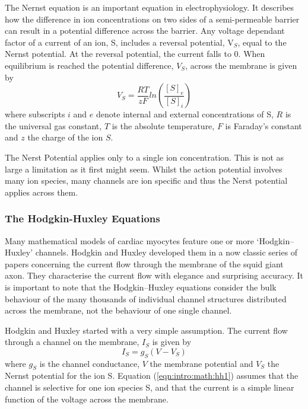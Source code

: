 The Nernst equation is an important equation in electrophysiology.
It describes how the difference in ion concentrations on two sides of a
semi-permeable barrier can result in a potential difference across the barrier.
Any voltage dependant factor of a current of an ion, S, includes a reversal
potential, V$_{S}$, equal to the Nernst potential.
At the reversal potential, the current falls to 0.
When equilibrium is reached the potential difference, $V_{S}$, across the
membrane is given by
\begin{equation}
V_{S} = \frac{RT}{zF}ln\left( \frac{[S]_{e}}{[S]_{i}} \right) 
\end{equation} 
where subscripts $i$ and $e$ denote internal and external concentrations of S,
$R$ is the universal gas constant, $T$ is the absolute temperature, $F$ is
Faraday's constant and $z$ the charge of the ion $S$.

The Nerst Potential applies only to a single ion concentration.
This is not as large a limitation as it first might seem.
Whilst the action potential involves many ion species, many channels are ion
specific and thus the Nerst potential applies across them.

\subsubsection{The Hodgkin-Huxley Equations}

Many mathematical models of cardiac myocytes feature one or more
`Hodgkin--Huxley' channels.
Hodgkin and Huxley developed them in a now classic series of papers concerning
the current flow through the membrane of the squid giant axon.
They characterise the current flow with elegance and surprising accuracy.
It is important to note that the Hodgkin--Huxley equations consider the bulk
behaviour of the many thousands of individual channel structures distributed
across the membrane, not the behaviour of one single channel.

Hodgkin and Huxley started with a very simple assumption.
The current flow through a channel on the membrane, $I_{S}$ is given by
\begin{equation}
I_{S} = g_{S}\left(V-V_{S}\right)
\label{eqn:intro:math:hh1}
\end{equation}
where $g_{S}$ is the channel conductance, $V$ the membrane potential and $V_{S}$
the Nernst potential for the ion S.
Equation (\ref{eqn:intro:math:hh1}) assumes that the channel is selective for
one ion species S, and that the current is a simple linear function of the
voltage across the membrane.


